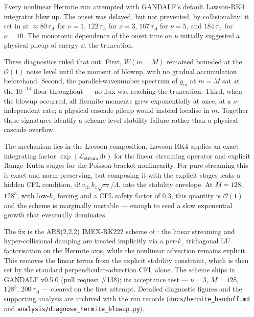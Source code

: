 \documentclass[11pt]{article}
\newcommand{\taua}{\tau_A}
\newcommand{\vth}{v_{\mathrm{th}}}
\begin{document}
Every nonlinear Hermite run attempted with GANDALF's default Lawson-RK4 integrator blew up. The onset was delayed, but not prevented, by collisionality: it set in at $\approx 80\,\taua$ for $\nu = 1$, $122\,\taua$ for $\nu = 3$, $167\,\taua$ for $\nu = 5$, and $184\,\taua$ for $\nu = 10$. The monotonic dependence of the onset time on $\nu$ initially suggested a physical pileup of energy at the truncation.

Three diagnostics ruled that out. First, $W(m = M)$ remained bounded at the $\mathcal{O}(1)$ noise level until the moment of blowup, with no gradual accumulation beforehand. Second, the parallel-wavenumber spectrum of $g_m$ at $m = M$ sat at the $10^{-14}$ floor throughout --- no flux was reaching the truncation. Third, when the blowup occurred, all Hermite moments grew exponentially at once, at a $\nu$-independent rate; a physical cascade pileup would instead localise in $m$. Together these signatures identify a scheme-level stability failure rather than a physical cascade overflow.

The mechanism lies in the Lawson composition. Lawson-RK4 applies an exact integrating factor $\exp(\mathcal{L}_{\mathrm{stream}}\,\mathrm{d}t)$ for the linear streaming operator and explicit Runge--Kutta stages for the Poisson-bracket nonlinearity. For pure streaming this is exact and norm-preserving, but composing it with the explicit stages leaks a hidden CFL condition, $\mathrm{d}t\,\vth\,k_z\sqrt{m}/\Lambda$, into the stability envelope. At $M = 128$, $128^3$, with low-$k_z$ forcing and a CFL safety factor of $0.3$, this quantity is $\mathcal{O}(1)$ and the scheme is marginally unstable --- enough to seed a slow exponential growth that eventually dominates.

The fix is the ARS(2,2,2) IMEX-RK222 scheme of \citet{ascher1997}: the linear streaming and hyper-collisional damping are treated implicitly via a per-$k_z$ tridiagonal LU factorisation on the Hermite axis, while the nonlinear advection remains explicit. This removes the linear terms from the explicit stability constraint, which is then set by the standard perpendicular-advection CFL alone. The scheme ships in GANDALF v0.5.0 (pull request \#138); its acceptance test --- $\nu = 3$, $M = 128$, $128^3$, $200\,\taua$ --- cleared on the first attempt. Detailed diagnostic figures and the supporting analysis are archived with the run records (\texttt{docs/hermite\_handoff.md} and \texttt{analysis/diagnose\_hermite\_blowup.py}).



\end{document}
